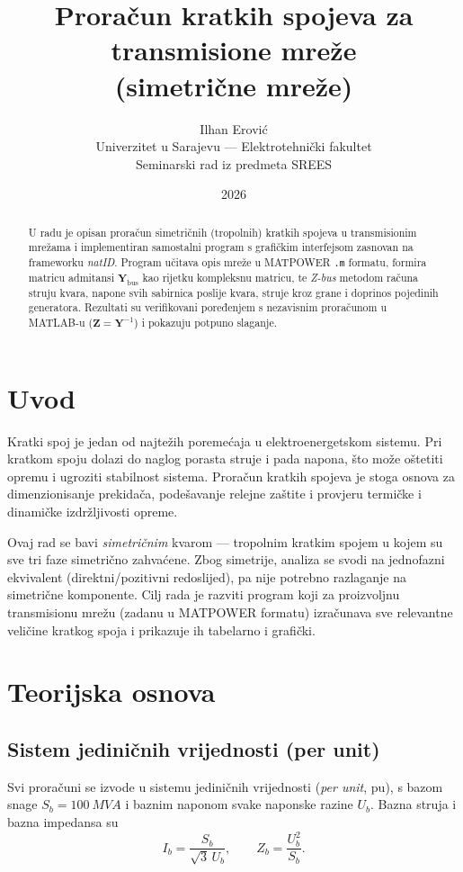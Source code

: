 \documentclass[12pt,a4paper]{article}
\title{\textbf{Proračun kratkih spojeva za transmisione mreže\\(simetrične mreže)}}
\author{Ilhan Erović\\[4pt]\normalsize Univerzitet u Sarajevu --- Elektrotehnički fakultet\\
\normalsize Seminarski rad iz predmeta SREES}
\date{2026}
\begin{document}
\maketitle

\begin{abstract}
\noindent U radu je opisan proračun simetričnih (tropolnih) kratkih spojeva u
transmisionim mrežama i implementiran samostalni program s grafičkim interfejsom
zasnovan na frameworku \emph{natID}. Program učitava opis mreže u MATPOWER
\texttt{.m} formatu, formira matricu admitansi $\mathbf{Y}_{\text{bus}}$ kao
rijetku kompleksnu matricu, te \emph{Z-bus} metodom računa struju kvara, napone
svih sabirnica poslije kvara, struje kroz grane i doprinos pojedinih generatora.
Rezultati su verifikovani poređenjem s nezavisnim proračunom u MATLAB-u
($\mathbf{Z}=\mathbf{Y}^{-1}$) i pokazuju potpuno slaganje.
\end{abstract}

\section{Uvod}
Kratki spoj je jedan od najtežih poremećaja u elektroenergetskom sistemu. Pri
kratkom spoju dolazi do naglog porasta struje i pada napona, što može oštetiti
opremu i ugroziti stabilnost sistema. Proračun kratkih spojeva je stoga osnova za
dimenzionisanje prekidača, podešavanje relejne zaštite i provjeru termičke i
dinamičke izdržljivosti opreme.

Ovaj rad se bavi \emph{simetričnim} kvarom --- tropolnim kratkim spojem u kojem su
sve tri faze simetrično zahvaćene. Zbog simetrije, analiza se svodi na
jednofazni ekvivalent (direktni/pozitivni redoslijed), pa nije potrebno
razlaganje na simetrične komponente. Cilj rada je razviti program koji za
proizvoljnu transmisionu mrežu (zadanu u MATPOWER formatu) izračunava sve
relevantne veličine kratkog spoja i prikazuje ih tabelarno i grafički.

\section{Teorijska osnova}

\subsection{Sistem jediničnih vrijednosti (per unit)}
Svi proračuni se izvode u sistemu jediničnih vrijednosti (\emph{per unit}, pu),
s bazom snage $S_b = \SI{100}{MVA}$ i baznim naponom svake naponske razine
$U_b$. Bazna struja i bazna impedansa su
\begin{equation}
I_b = \frac{S_b}{\sqrt{3}\,U_b}, \qquad Z_b = \frac{U_b^2}{S_b}.
\end{equation}
\end{document}

